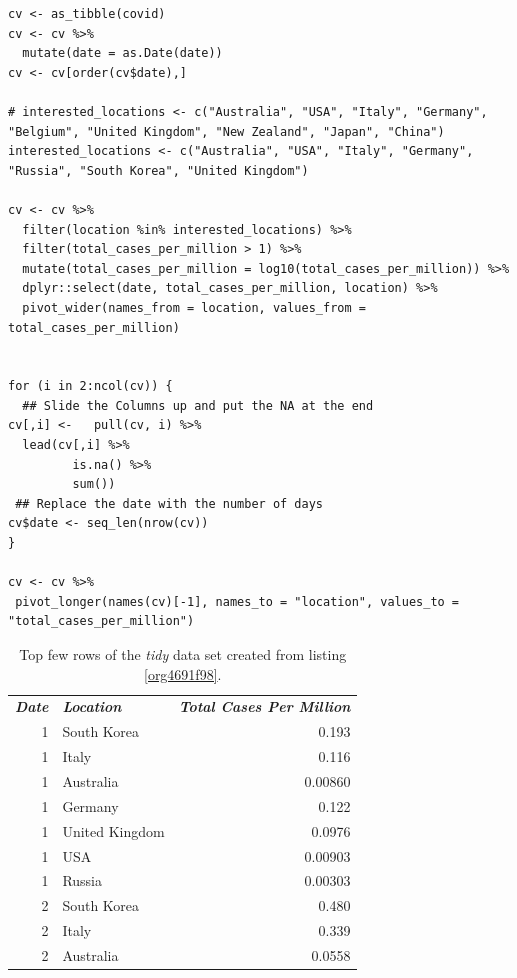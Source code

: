 \documentclass[11pt]{article}
\begin{document}
\begin{listing}[htbp]
\begin{verbatim}
cv <- as_tibble(covid)
cv <- cv %>%
  mutate(date = as.Date(date))
cv <- cv[order(cv$date),]

# interested_locations <- c("Australia", "USA", "Italy", "Germany", "Belgium", "United Kingdom", "New Zealand", "Japan", "China")
interested_locations <- c("Australia", "USA", "Italy", "Germany", "Russia", "South Korea", "United Kingdom")

cv <- cv %>%
  filter(location %in% interested_locations) %>%
  filter(total_cases_per_million > 1) %>%
  mutate(total_cases_per_million = log10(total_cases_per_million)) %>%
  dplyr::select(date, total_cases_per_million, location) %>%
  pivot_wider(names_from = location, values_from = total_cases_per_million)


for (i in 2:ncol(cv)) {
  ## Slide the Columns up and put the NA at the end
cv[,i] <-   pull(cv, i) %>%
  lead(cv[,i] %>%
         is.na() %>%
         sum())
 ## Replace the date with the number of days
cv$date <- seq_len(nrow(cv))
}

cv <- cv %>%
 pivot_longer(names(cv)[-1], names_to = "location", values_to = "total_cases_per_million")
\end{verbatim}
\caption{\label{org4691f98}Use \texttt{dplyr} to transform the data as shown in table \ref{tab:orge7eb163}, this can then be passed to ggplot as shown in listing \ref{org5bb4fe3}}
\end{listing}

\begin{table}[htbp]
\caption{\label{tab:orge7eb163}Top few rows of the \emph{tidy} data set created from listing \ref{org4691f98}.}
\centering
\begin{tabular}{rlr}
\emph{\textbf{Date}} & \emph{\textbf{Location}} & \emph{\textbf{Total Cases Per Million}}\\
1 & South Korea & 0.193\\
1 & Italy & 0.116\\
1 & Australia & 0.00860\\
1 & Germany & 0.122\\
1 & United Kingdom & 0.0976\\
1 & USA & 0.00903\\
1 & Russia & 0.00303\\
2 & South Korea & 0.480\\
2 & Italy & 0.339\\
2 & Australia & 0.0558\\
\end{tabular}
\end{table}
\end{document}

